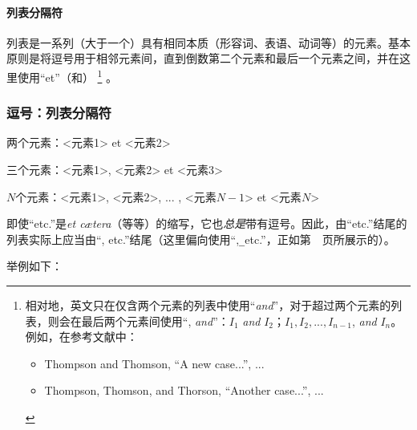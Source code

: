 \paragraph{列表分隔符} 列表是一系列（大于一个）具有相同本质（形容词、表语、动词等）的元素。基本原则是将逗号用于相邻元素间，直到倒数第二个元素和最后一个元素之间，并在这里使用``et''（和）
    \footnote{相对地，英文只在仅含两个元素的列表中使用``\emph{and}''，对于超过两个元素的列表，则会在最后两个元素间使用``, \emph{and}''：$I_1$ \emph{and} $I_2$；$I_1, I_2, ... , I_{n-1}$, \emph{and} $I_n$。例如，在参考文献中：
    \begin{itemize}
        \item Thompson and Thomson, ``A new case...'', ...
        \item Thompson, Thomson, and Thorson, ``Another case...'', ...
    \end{itemize}
    }
。

\begin{mdframed}
    \subsubsection*{逗号：列表分隔符}

    \noindent 两个元素：<元素1> et <元素2>

    \noindent 三个元素：<元素1>, <元素2> et <元素3>

    \noindent $N$个元素：<元素1>, <元素2>, ... , <元素$N-1$> et <元素$N$>
\end{mdframed}

即使``etc.''是\emph{et cætera}（等等）的缩写，它也\emph{总是}带有逗号。因此，由``etc.''结尾的列表实际上应当由``, etc.''结尾（这里偏向使用``,\verb|_|etc.''，正如第~\pageref{p33}~页所展示的）。

举例如下：

